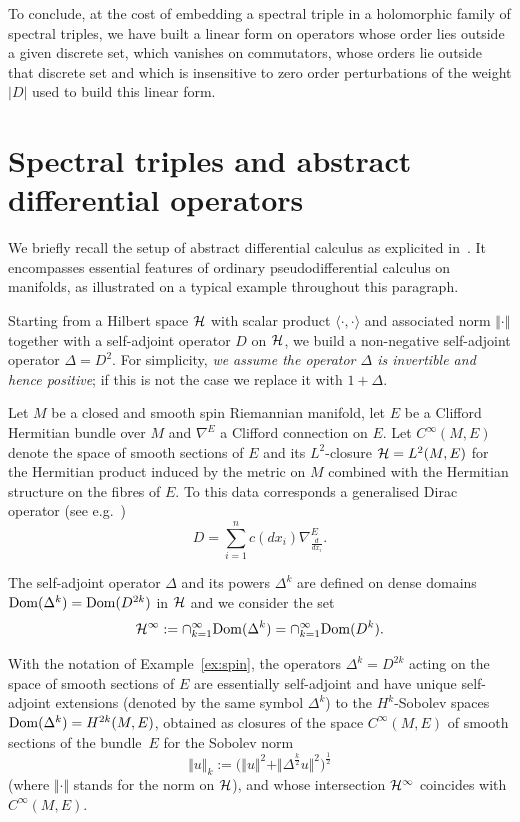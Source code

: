 \documentclass[pdftex]{sigma}
\def \Ci {{C^\infty}}
\numberwithin{equation}{section}
\begin{document}
 To conclude, at the cost of
embedding a spectral triple in a holomorphic family of spectral triples, we
have built  a  linear form on  operators whose order lies outside a
given discrete set,  which  vanishes on commutators, whose orders lie outside
that discrete set and which is   insensitive to zero order perturbations of the weight $\vert D\vert$
used to build
this linear form.

\section{Spectral triples and abstract dif\/ferential operators}\label{section2}

We brief\/ly recall the setup of abstract dif\/ferential calculus as
explicited in~\cite{Hig}. It encompasses essential features of ordinary
pseudodif\/ferential calculus on manifolds, as  illustrated on a typical
example throughout this paragraph.

 Starting from a Hilbert space $ {\cal H}$ with scalar product $\langle\cdot, \cdot\rangle$ and associated norm $\Vert \cdot\Vert$ together with   a
self-adjoint operator $D$ on ${\cal H}$, we build a
non-negative self-adjoint operator $\Delta= D^2$.  For simplicity,  {\it we assume
the operator $\Delta$ is
invertible and hence positive}; if this is not the case we replace it  with
$1+\Delta$.
\begin{example}\label{ex:spin} Let $M$ be a closed and  smooth spin Riemannian  manifold, let  $E$
 be  a Clif\/ford Hermitian bundle
  over $M$ and $\nabla^E$ a Clif\/ford connection on $E$. Let $\Ci(M,E)$ denote
  the space of smooth sections of $E$ and  its $L^2$-closure ${\cal H}=L^2(M, E)$ for
  the Hermitian product induced by the metric on $M$ combined with the Hermitian
  structure on the f\/ibres of $E$. To this data corresponds a generalised Dirac
  operator (see e.g.~\cite{BGV})
  \[
  D= \sum_{i=1}^n c(dx_i)
  \nabla_{\frac{d}{dx_i}}^E.
  \]
\end{example}

 The self-adjoint operator $\Delta$ and its powers $\Delta^k$ are def\/ined on
 dense  domains    $ {\rm
    Dom}(\Delta^k)={\rm
    Dom}(D^{2k})$ in ${\cal H}$ and we consider the set
    \[
    {\cal H}^\infty:= \cap_{k=1}^\infty {\rm
    Dom}(\Delta^k)=\cap_{k=1}^\infty {\rm
    Dom}(D^k).
    \]

\begin{example}
With the notation of Example~\ref{ex:spin},  the operators
$\Delta^k=D^{2k}$ acting on the space of smooth sections of $E$ are essentially self-adjoint and have  unique self-adjoint extensions (denoted by the same symbol $\Delta^k$) to the   $H^k$-Sobolev spaces
  ${\rm Dom}(\Delta^k)=H^{2k}(M, E)$, obtained as closures of the space
  $\Ci(M,E)$ of smooth sections of the bundle~$E$ for the Sobolev norm
\[
\Vert u\Vert_{k}:= \big(\Vert u\Vert^2+ \Vert \Delta^{\frac{k}{2}}  u\Vert^2\big)^{\frac{1}{2}}
 \]
 (where $\Vert\cdot\Vert$ stands for the norm
on ${\cal H}$), and whose intersection ${\cal H}^\infty$
  coincides with  $\Ci(M, E)$.
\end{example}
\end{document}
